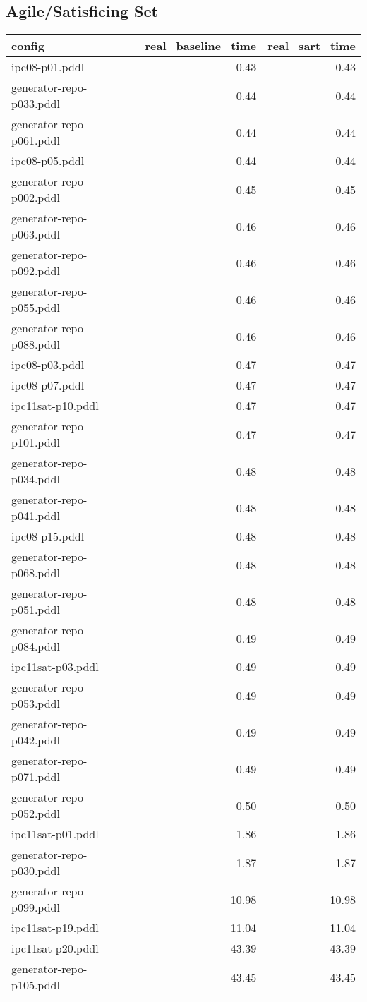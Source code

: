 \documentclass{article}
\begin{document}
                    \subsection*{Agile/Satisficing Set}
                    
                            \begin{center}
                            \scriptsize
                            \begin{tabular}{@{}l|r|r@{}}
                            config & real\_baseline\_time & real\_sart\_time\\\midrule
                             ipc08-p01.pddl&0.43&0.43\\
 generator-repo-p033.pddl&0.44&0.44\\
 generator-repo-p061.pddl&0.44&0.44\\
 ipc08-p05.pddl&0.44&0.44\\
 generator-repo-p002.pddl&0.45&0.45\\
 generator-repo-p063.pddl&0.46&0.46\\
 generator-repo-p092.pddl&0.46&0.46\\
 generator-repo-p055.pddl&0.46&0.46\\
 generator-repo-p088.pddl&0.46&0.46\\
 ipc08-p03.pddl&0.47&0.47\\
 ipc08-p07.pddl&0.47&0.47\\
 ipc11sat-p10.pddl&0.47&0.47\\
 generator-repo-p101.pddl&0.47&0.47\\
 generator-repo-p034.pddl&0.48&0.48\\
 generator-repo-p041.pddl&0.48&0.48\\
 ipc08-p15.pddl&0.48&0.48\\
 generator-repo-p068.pddl&0.48&0.48\\
 generator-repo-p051.pddl&0.48&0.48\\
 generator-repo-p084.pddl&0.49&0.49\\
 ipc11sat-p03.pddl&0.49&0.49\\
 generator-repo-p053.pddl&0.49&0.49\\
 generator-repo-p042.pddl&0.49&0.49\\
 generator-repo-p071.pddl&0.49&0.49\\
 generator-repo-p052.pddl&0.50&0.50\\
 ipc11sat-p01.pddl&1.86&1.86\\
 generator-repo-p030.pddl&1.87&1.87\\
 generator-repo-p099.pddl&10.98&10.98\\
 ipc11sat-p19.pddl&11.04&11.04\\
 ipc11sat-p20.pddl&43.39&43.39\\
 generator-repo-p105.pddl&43.45&43.45
                            \end{tabular}
                            \end{center}
                    
\end{document}
